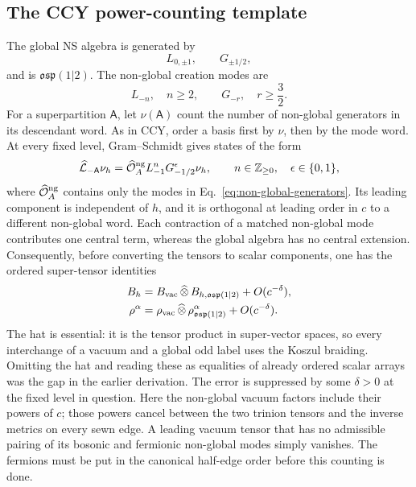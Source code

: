 \documentclass[11pt]{article}
\newcommand{\osp}{\mathfrak{osp}(1|2)}
\begin{document}
\subsection{The CCY power-counting template}

The global NS algebra is generated by
\begin{equation}
 L_{0,\pm1},
 \qquad
 G_{\pm1/2},
 \label{eq:global-generators}
\end{equation}
and is \(\osp\).  The non-global creation modes are
\begin{equation}
 L_{-n},\quad n\ge2,
 \qquad
 G_{-r},\quad r\ge\frac32.
 \label{eq:non-global-generators}
\end{equation}
For a superpartition \(\mathsf A\), let \(\nu(\mathsf A)\) count the number
of non-global generators in its descendant word.  As in CCY, order a basis
first by \(\nu\), then by the mode word.  At every fixed level,
Gram--Schmidt gives states of the form
\begin{equation}
 \widehat{\mathcal L}_{-\mathsf A}\nu_h
 =\widehat{\mathcal O}_{A}^{\rm ng}
  L_{-1}^{n}G_{-1/2}^{\epsilon}\nu_h,
 \qquad n\in\mathbb Z_{\ge0},\quad\epsilon\in\{0,1\},
 \label{eq:split-basis}
\end{equation}
where \(\widehat{\mathcal O}_{A}^{\rm ng}\) contains only the modes in
Eq.~\eqref{eq:non-global-generators}.  Its leading component is independent
of \(h\), and it is orthogonal at leading order in \(c\) to a different
non-global word.  Each contraction of a matched non-global mode contributes
one central term, whereas the global algebra has no central extension.
Consequently, before converting the tensors to scalar components, one has
the ordered super-tensor identities
\begin{align}
 B_h
 &=B_{\rm vac}\,\widehat\otimes\,B_{h,\osp}
   +O(c^{-\delta}),
 \label{eq:metric-factorization}\\
 \rho^\alpha
 &=\rho_{\rm vac}\,\widehat\otimes\,\rho_{\osp}^{\alpha}
   +O(c^{-\delta}).
 \label{eq:vertex-factorization}
\end{align}
The hat is essential: it is the tensor product in super-vector spaces, so
every interchange of a vacuum and a global odd label uses the Koszul
braiding.  Omitting the hat and reading these as equalities of already
ordered scalar arrays was the gap in the earlier derivation.
The error is suppressed by some \(\delta>0\) at the fixed level in question.
Here the non-global vacuum factors include their powers of \(c\); those
powers cancel between the two trinion tensors and the inverse metrics on
every sewn edge.  A leading vacuum tensor that has no admissible pairing of
its bosonic and fermionic non-global modes simply vanishes.  The fermions
must be put in the canonical half-edge order before this counting is done.
\end{document}

